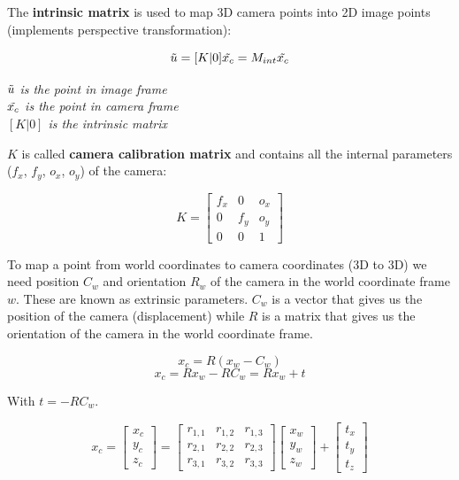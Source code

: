 \documentclass{article}
\begin{document}
The \textbf{intrinsic matrix} is used to map 3D camera points into 2D image points (implements perspective transformation):

\begin{equation*}
    \Tilde{u} = [K | 0]\Tilde{x_c} = M_{int} \Tilde{x_c}
\end{equation*}

\begin{center}
    \textit{$\Tilde{u}$ is the point in image frame} \\
    \textit{$\Tilde{x_c}$ is the point in camera frame} \\
    \textit{$[K | 0]$ is the intrinsic matrix}
\end{center}

$K$ is called \textbf{camera calibration matrix} and contains all the internal parameters ($f_x$, $f_y$, $o_x$, $o_y$) of the camera:

\begin{equation*}
    K = 
    \begin{bmatrix}
        f_x & 0 & o_x \\
        0 & f_y & o_y \\
        0 & 0 & 1
    \end{bmatrix}
\end{equation*}

To map a point from world coordinates to camera coordinates (3D to 3D) we need position $C_w$ and orientation $R_w$ of the camera in the world coordinate frame $w$. These are known as extrinsic parameters. $C_w$ is a vector that gives us the position of the camera (displacement) while $R$ is a matrix that gives us the orientation of the camera in the world coordinate frame.

\begin{equation*}
    x_c = R(x_w - C_w)
\end{equation*}
\begin{equation*}
    x_c = Rx_w - RC_w = Rx_w + t
\end{equation*}

With $t = -R C_w$. 

\begin{equation*}
    x_c = 
    \begin{bmatrix}
        x_c \\
        y_c \\
        z_c
    \end{bmatrix}
    =
    \begin{bmatrix}
        r_{1,1} & r_{1,2} & r_{1,3} \\
        r_{2,1} & r_{2,2} & r_{2,3} \\
        r_{3,1} & r_{3,2} & r_{3,3}
    \end{bmatrix}
    \begin{bmatrix}
        x_w \\
        y_w \\
        z_w
    \end{bmatrix}
    +
    \begin{bmatrix}
        t_x \\
        t_y \\
        t_z
    \end{bmatrix}
\end{equation*}
\end{document}
